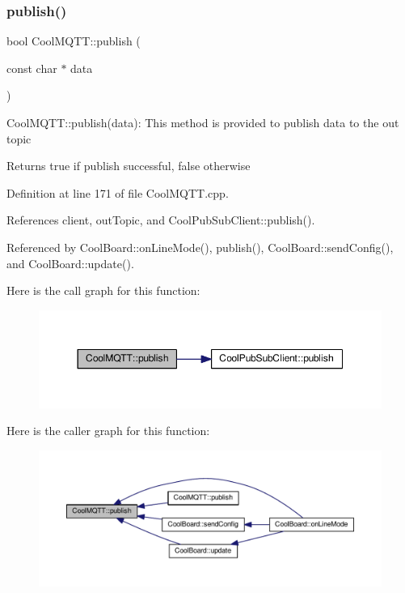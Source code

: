 \subsubsection{\texorpdfstring{publish()}{publish()}\hspace{0.1cm}{\footnotesize\ttfamily [1/2]}}
{\footnotesize\ttfamily bool Cool\+M\+Q\+T\+T\+::publish (\begin{DoxyParamCaption}\item[{const char $\ast$}]{data }\end{DoxyParamCaption})}

Cool\+M\+Q\+T\+T\+::publish(data)\+: This method is provided to publish data to the out topic

\begin{DoxyReturn}{Returns}
true if publish successful, false otherwise 
\end{DoxyReturn}


Definition at line 171 of file Cool\+M\+Q\+T\+T.\+cpp.



References client, out\+Topic, and Cool\+Pub\+Sub\+Client\+::publish().



Referenced by Cool\+Board\+::on\+Line\+Mode(), publish(), Cool\+Board\+::send\+Config(), and Cool\+Board\+::update().

Here is the call graph for this function\+:\nopagebreak
\begin{figure}[H]
\begin{center}
\leavevmode
\includegraphics[width=350pt]{d0/dd0/class_cool_m_q_t_t_ace977b3e90ab14b1199fe5c4fb0a13ec_cgraph}
\end{center}
\end{figure}
Here is the caller graph for this function\+:
\nopagebreak
\begin{figure}[H]
\begin{center}
\leavevmode
\includegraphics[width=350pt]{d0/dd0/class_cool_m_q_t_t_ace977b3e90ab14b1199fe5c4fb0a13ec_icgraph}
\end{center}
\end{figure}
\mbox{\label{class_cool_m_q_t_t_a613c5e3927ae85bb94fbf648d84d8780}} 

